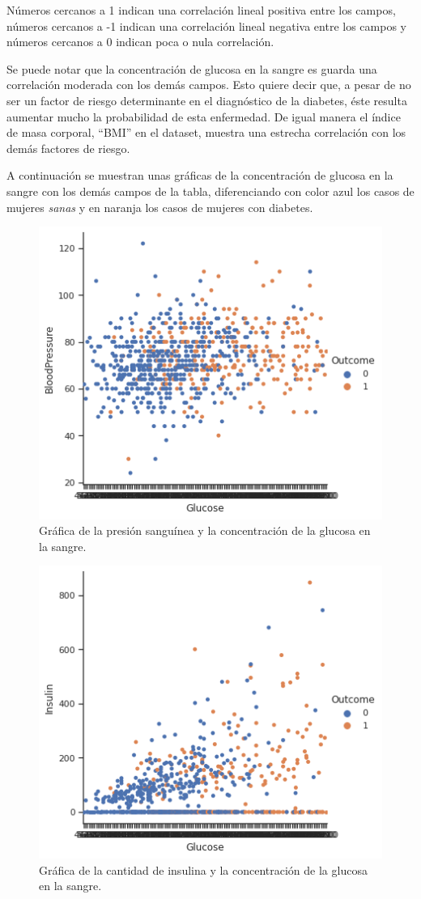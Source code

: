 \documentclass{article}
\begin{document}
Números cercanos a 1 indican una correlación lineal positiva entre los campos, números cercanos a -1 indican una correlación lineal negativa entre los campos y números cercanos a 0 indican poca o nula correlación.

Se puede notar que la concentración de glucosa en la sangre es guarda una correlación moderada con los demás campos. Esto quiere decir que, a pesar de no ser un factor de riesgo determinante en el diagnóstico de la diabetes, éste resulta aumentar mucho la probabilidad de esta enfermedad. De igual manera el índice de masa corporal, ``BMI'' en el dataset, muestra una estrecha correlación con los demás factores de riesgo. 

A continuación se muestran unas gráficas de la concentración de glucosa en la sangre con los demás campos de la tabla, diferenciando con color azul los casos de mujeres \emph{sanas} y en naranja los casos de mujeres con diabetes.

\begin{figure}[H]
	\centering
	\includegraphics[width=0.65\linewidth]{BloodPressure_Glucose.png}
	\caption{Gráfica de la presión sanguínea y la concentración de la glucosa en la sangre.}%
	\label{fig:BloodPressure_Glucose}
\end{figure}

\begin{figure}[H]
	\centering
	\includegraphics[width=0.65\linewidth]{Insulin_Glucose.png}
	\caption{Gráfica de la cantidad de insulina y la concentración de la glucosa en la sangre.}%
	\label{fig:Insulin_Glucose}
\end{figure}
\end{document}
